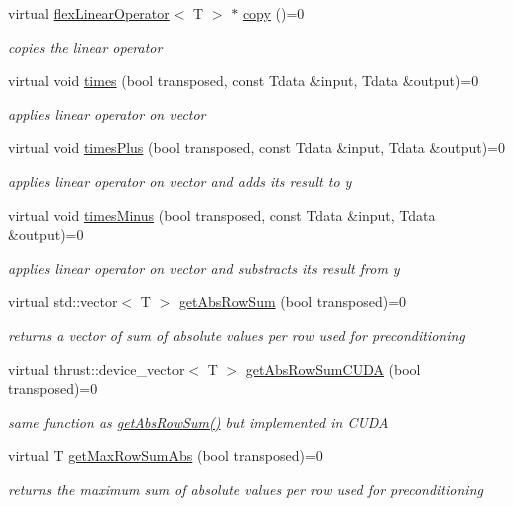 \begin{DoxyCompactItemize}
virtual \hyperlink{classflex_linear_operator}{flex\+Linear\+Operator}$<$ T $>$ $\ast$ \hyperlink{classflex_linear_operator_a7cc1425677cc30fcbd092ffd28d508c9}{copy} ()=0
\begin{DoxyCompactList}\small\item\em copies the linear operator \end{DoxyCompactList}\item 
virtual void \hyperlink{classflex_linear_operator_a883982edf3be857815d2095e53f76e75}{times} (bool transposed, const Tdata \&input, Tdata \&output)=0
\begin{DoxyCompactList}\small\item\em applies linear operator on vector \end{DoxyCompactList}\item 
virtual void \hyperlink{classflex_linear_operator_a3f2978ad1c5eae8cd4ae16deb2337416}{times\+Plus} (bool transposed, const Tdata \&input, Tdata \&output)=0
\begin{DoxyCompactList}\small\item\em applies linear operator on vector and adds its result to y \end{DoxyCompactList}\item 
virtual void \hyperlink{classflex_linear_operator_a62708874e134a649c8445df333079c69}{times\+Minus} (bool transposed, const Tdata \&input, Tdata \&output)=0
\begin{DoxyCompactList}\small\item\em applies linear operator on vector and substracts its result from y \end{DoxyCompactList}\item 
virtual std\+::vector$<$ T $>$ \hyperlink{classflex_linear_operator_ad6caa7b09e6e3c401cadef61b8e2307e}{get\+Abs\+Row\+Sum} (bool transposed)=0
\begin{DoxyCompactList}\small\item\em returns a vector of sum of absolute values per row used for preconditioning \end{DoxyCompactList}\item 
virtual thrust\+::device\+\_\+vector$<$ T $>$ \hyperlink{classflex_linear_operator_a0a0a431d43f4f9d36cbee0d31ba5a29b}{get\+Abs\+Row\+Sum\+C\+U\+DA} (bool transposed)=0
\begin{DoxyCompactList}\small\item\em same function as \hyperlink{classflex_linear_operator_ad6caa7b09e6e3c401cadef61b8e2307e}{get\+Abs\+Row\+Sum()} but implemented in C\+U\+DA \end{DoxyCompactList}\item 
virtual T \hyperlink{classflex_linear_operator_afcb74697385ccb7c8d29870d7034c12a}{get\+Max\+Row\+Sum\+Abs} (bool transposed)=0
\begin{DoxyCompactList}\small\item\em returns the maximum sum of absolute values per row used for preconditioning \end{DoxyCompactList}\end{DoxyCompactItemize}
